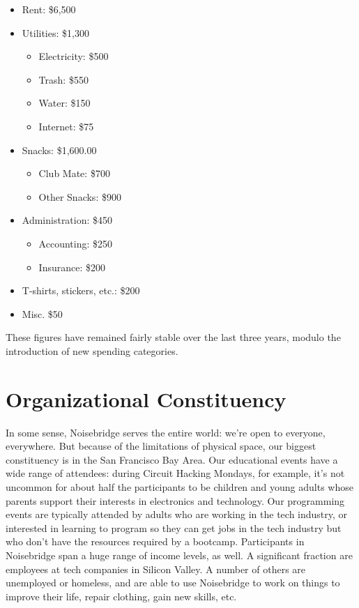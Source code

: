 \documentclass[12pt]{article}
\begin{document}
\begin{itemize}
    \item Rent: \$6,500
    \item Utilities: \$1,300
        \begin{itemize}
            \item Electricity: \$500
            \item Trash: \$550
            \item Water: \$150
            \item Internet: \$75
        \end{itemize}
    \item Snacks: \$1,600.00
        \begin{itemize}
            \item Club Mate: \$700
            \item Other Snacks: \$900
        \end{itemize}
    \item Administration: \$450
        \begin{itemize}
            \item Accounting: \$250
            \item Insurance: \$200
        \end{itemize}
    \item T-shirts, stickers, etc.: \$200
    \item Misc. \$50
\end{itemize}

These figures have remained fairly stable over the last three years, modulo the introduction of new spending categories.





\section{Organizational Constituency}

In some sense, Noisebridge serves the entire world: we're open to everyone, everywhere. But because of the limitations of physical space, our biggest constituency is in the San Francisco Bay Area. Our educational events have a wide range of attendees: during Circuit Hacking Mondays, for example, it's not uncommon for about half the participants to be children and young adults whose parents support their interests in electronics and technology. Our programming events are typically attended by adults who are working in the tech industry, or interested in learning to program so they can get jobs in the tech industry but who don't have the resources required by a bootcamp. Participants in Noisebridge span a huge range of income levels, as well. A significant fraction are employees at tech companies in Silicon Valley. A number of others are unemployed or homeless, and are able to use Noisebridge to work on things to improve their life, repair clothing, gain new skills, etc.
\end{document}
